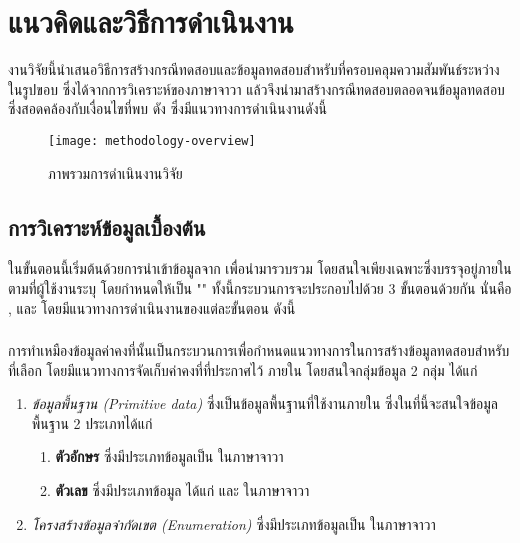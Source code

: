 \section{แนวคิดและวิธีการดำเนินงาน}
\label{sec:methodology}

งานวิจัยนี้นำเสนอวิธีการสร้างกรณีทดสอบและข้อมูลทดสอบสำหรับ{\TestPath}ที่ครอบคลุมความสัมพันธ์ระหว่าง{\softwareComponent}ในรูปขอบ{\scg} 
ซึ่งได้จากการวิเคราะห์{\StaticInformation}ของ{\sourcecode}ภาษาจาวา แล้วจึงนำมาสร้างกรณีทดสอบตลอดจนข้อมูลทดสอบซึ่งสอดคล้องกับเงื่อนไขที่พบ
ดัง ซึ่งมีแนวทางการดำเนินงานดังนี้

\begin{sidewaysfigure}
    \centering
    \texttt{[image: methodology-overview]}
    \caption{ภาพรวมการดำเนินงานวิจัย}
    \label{fig:methodologyoverview}
\end{sidewaysfigure}

\subsection{การวิเคราะห์ข้อมูลเบื้องต้น}
\label{subs:introsection}

ในขั้นตอนนี้เริ่มต้นด้วยการนำเข้าข้อมูล{\sourcecode}จาก{\Repository} เพื่อนำมารวบรวม{\StaticInformation} 
โดยสนใจเพียงเฉพาะ{\class}ซึ่งบรรจุอยู่ภายใน\FirstTimeDefine{\Package}{\PackageEN} ตามที่ผู้ใช้งานระบุ 
โดยกำหนดให้เป็น "\FirstTimeDefine{\CUT}{\CUTEN}" ทั้งนี้กระบวนการจะประกอบไปด้วย 3 ขั้นตอนด้วยกัน นั่นคือ
\FirstTimeDefine{\constantExtracting}, \FirstTimeDefine{\graphCreation}{\graphCreationEN} 
และ\FirstTimeDefine{\sourcecodeInstrumention}{\sourcecodeInstrumentionEN} 
โดยมีแนวทางการดำเนินงานของแต่ละขั้นตอน ดังนี้

\subsubsection{\FirstTimeDefine{\constantExtracting}{\constantExtractingEN}}
\label{sec:sub:sub:sourceCodeExtract}

การทำเหมืองข้อมูลค่าคงที่นั้นเป็นกระบวนการเพื่อกำหนดแนวทางการในการสร้างข้อมูลทดสอบสำหรับ{\TestPath}ที่เลือก โดยมีแนวทางการจัดเก็บค่าคงที่ที่ประกาศไว้
ภายใน{\sourcecode} โดยสนใจกลุ่มข้อมูล 2 กลุ่ม ได้แก่

\begin{enumerate}
    \item {\it ข้อมูลพื้นฐาน (Primitive data)} ซึ่งเป็นข้อมูลพื้นฐานที่ใช้งานภายใน{\class} ซึ่งในที่นี้จะสนใจข้อมูลพื้นฐาน 2 ประเภทได้แก่
        \begin{enumerate}
            \item {\bf ตัวอักษร} ซึ่งมีประเภทข้อมูลเป็น  ในภาษาจาวา
            \item {\bf ตัวเลข} ซึ่งมีประเภทข้อมูล ได้แก่  และ ในภาษาจาวา
        \end{enumerate}
    \item {\it โครงสร้างข้อมูลจำกัดเขต (Enumeration)} ซึ่งมีประเภทข้อมูลเป็น  ในภาษาจาวา
\end{enumerate}

